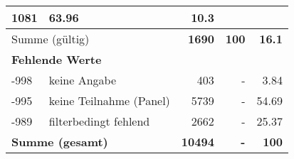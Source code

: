 \begin{longtable}{lXrrr}
       \num{1081} &
       \num[round-mode=places,round-precision=2]{63,96} &
         \num[round-mode=places,round-precision=2]{10,3} \\
     \midrule
     \multicolumn{2}{l}{Summe (gültig)} &
       \textbf{\num{1690}} &
     \textbf{100} &
       \textbf{\num[round-mode=places,round-precision=2]{16,1}} \\
     \multicolumn{5}{l}{\textbf{Fehlende Werte}}\\
       -998 &
       keine Angabe &
         \num{403} &
        - &
         \num[round-mode=places,round-precision=2]{3,84} \\
       -995 &
       keine Teilnahme (Panel) &
         \num{5739} &
        - &
         \num[round-mode=places,round-precision=2]{54,69} \\
       -989 &
       filterbedingt fehlend &
         \num{2662} &
        - &
         \num[round-mode=places,round-precision=2]{25,37} \\
     \midrule
     \multicolumn{2}{l}{\textbf{Summe (gesamt)}} &
          \textbf{\num{10494}} &
        \textbf{-} &
        \textbf{100} \\
     \bottomrule
     \end{longtable}
     
